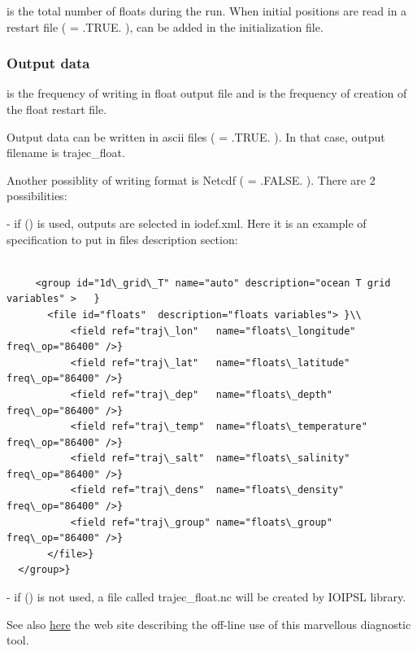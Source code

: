  is the total number of floats during the run.
When initial positions are read in a restart file ( = .TRUE. ),  
can be added in the initialization file. 

\subsubsection{ Output data }

 is the frequency of writing in float output file and  
is the frequency of creation of the float restart file.

Output data can be written in ascii files ( = .TRUE. ). In that case, 
output filename is trajec\_float.

Another possiblity of writing format is Netcdf ( = .FALSE. ). There are 2 possibilities:

 - if () is used, outputs are selected in  iodef.xml. Here it is an example of specification 
   to put in files description section:

\vspace{-30pt}
\begin{alltt}  {{\scriptsize
\begin{verbatim}

     <group id="1d\_grid\_T" name="auto" description="ocean T grid variables" >   }
       <file id="floats"  description="floats variables"> }\\
           <field ref="traj\_lon"   name="floats\_longitude"   freq\_op="86400" />}
           <field ref="traj\_lat"   name="floats\_latitude"    freq\_op="86400" />}
           <field ref="traj\_dep"   name="floats\_depth"       freq\_op="86400" />}
           <field ref="traj\_temp"  name="floats\_temperature" freq\_op="86400" />}
           <field ref="traj\_salt"  name="floats\_salinity"    freq\_op="86400" />}
           <field ref="traj\_dens"  name="floats\_density"     freq\_op="86400" />}
           <field ref="traj\_group" name="floats\_group"       freq\_op="86400" />}
       </file>}
  </group>}

\end{verbatim}
}}\end{alltt}


 -  if () is not used, a file called trajec\_float.nc will be created by IOIPSL library.



See also \href{http://stockage.univ-brest.fr/~grima/Ariane/}{here} the web site describing 
the off-line use of this marvellous diagnostic tool.


